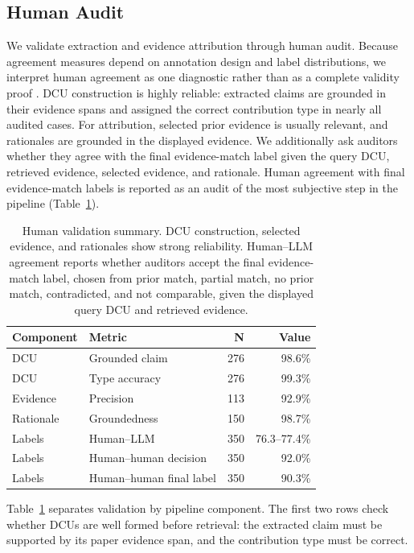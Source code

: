 \documentclass[11pt]{article}
\begin{document}
\subsection{Human Audit}
We validate extraction and evidence attribution through human audit.
Because agreement measures depend on annotation design and label distributions, we interpret human agreement as one diagnostic rather than as a complete validity proof \citep{artstein2008intercoder}.
DCU construction is highly reliable: extracted claims are grounded in their evidence spans and assigned the correct contribution type in nearly all audited cases.
For attribution, selected prior evidence is usually relevant, and rationales are grounded in the displayed evidence.
We additionally ask auditors whether they agree with the final evidence-match label given the query DCU, retrieved evidence, selected evidence, and rationale.
Human agreement with final evidence-match labels is reported as an audit of the most subjective step in the pipeline (Table~\ref{tab:human_audit}).
\begin{table}[h]
\centering
\small
\setlength{\tabcolsep}{3pt}
\begin{tabular}{llrr}
\toprule
Component & Metric & N & Value \\
\midrule
DCU & Grounded claim & 276 & 98.6\% \\
DCU & Type accuracy & 276 & 99.3\% \\
Evidence & Precision & 113 & 92.9\% \\
Rationale & Groundedness & 150 & 98.7\% \\
Labels & Human--LLM & 350 & 76.3--77.4\% \\
Labels & Human--human decision & 350 & 92.0\% \\
Labels & Human--human final label & 350 & 90.3\% \\
\bottomrule
\end{tabular}
\caption{Human validation summary. DCU construction, selected evidence, and rationales show strong reliability. Human--LLM agreement reports whether auditors accept the final evidence-match label, chosen from prior match, partial match, no prior match, contradicted, and not comparable, given the displayed query DCU and retrieved evidence.}
\label{tab:human_audit}
\end{table}
Table~\ref{tab:human_audit} separates validation by pipeline component.
The first two rows check whether DCUs are well formed before retrieval: the extracted claim must be supported by its paper evidence span, and the contribution type must be correct.
\end{document}
